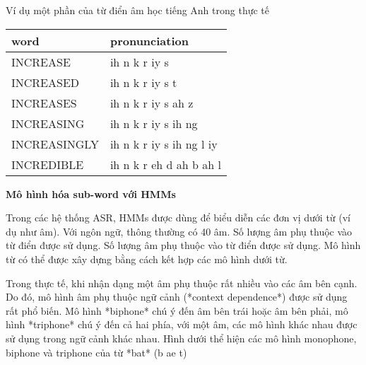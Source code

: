 

Ví dụ một phần của từ điển âm học tiếng Anh trong thực tế

\begin{tabular}{ | l | l | }
  \hline
  word & pronunciation \\ \hline
  INCREASE & ih n k r iy s \\ \hline
  INCREASED & ih n k r iy s t \\ \hline
  INCREASES & ih n k r iy s ah z \\ \hline
  INCREASING & ih n k r iy s ih ng  \\ \hline
  INCREASINGLY & ih n k r iy s ih ng l iy \\ \hline
  INCREDIBLE & ih n k r eh d ah b ah l \\ \hline
\end{tabular}


\textbf{Mô hình hóa sub-word với HMMs}

Trong các hệ thống ASR, HMMs được dùng để biểu diễn các đơn vị dưới từ (ví dụ như âm). Với ngôn ngữ, thông thường có 40 âm. Số lượng âm phụ thuộc vào từ điển được sử dụng. Số lượng âm phụ thuộc vào từ điển được sử dụng. Mô hình từ có thể được xây dựng bằng cách kết hợp các mô hình dưới từ.

Trong thực tế, khi nhận dạng một âm phụ thuộc rất nhiều vào các âm bên cạnh. Do đó, mô hình âm phụ thuộc ngữ cảnh (*context dependence*) được sử dụng rất phổ biến. Mô hình *biphone* chú ý đến âm bên trái hoặc âm bên phải, mô hình *triphone* chú ý đến cả hai phía, với một âm, các mô hình khác nhau được sử dụng trong ngữ cảnh khác nhau. Hình dưới thể hiện các mô hình monophone, biphone và triphone của từ *bat* (b ae t)

